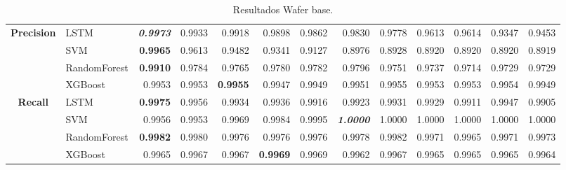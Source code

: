 \begin{table}[H]
\begin{adjustbox}{max width=12cm}
\begin{tabular}{|c|l|r|r|r|r|r|r|r|r|r|r|r|}
			\hline
			\textbf{Precision} &  LSTM & \textit{ \textbf{  0.9973 } } &  0.9933 &  0.9918 &  0.9898 &  0.9862 &  0.9830 &  0.9778 &  0.9613 &  0.9614 &  0.9347 &  0.9453 \\
			&  SVM & \textbf{  0.9965 } &  0.9613 &  0.9482 &  0.9341 &  0.9127 &  0.8976 &  0.8928 &  0.8920 &  0.8920 &  0.8920 &  0.8919 \\
			&  RandomForest & \textbf{  0.9910 } &  0.9784 &  0.9765 &  0.9780 &  0.9782 &  0.9796 &  0.9751 &  0.9737 &  0.9714 &  0.9729 &  0.9729 \\
			&  XGBoost &  0.9953 &  0.9953 & \textbf{  0.9955 } &  0.9947 &  0.9949 &  0.9951 &  0.9955 &  0.9953 &  0.9953 &  0.9954 &  0.9949 \\
			\hline
			\textbf{Recall} &  LSTM & \textbf{  0.9975 } &  0.9956 &  0.9934 &  0.9936 &  0.9916 &  0.9923 &  0.9931 &  0.9929 &  0.9911 &  0.9947 &  0.9905 \\
			&  SVM &  0.9956 &  0.9953 &  0.9969 &  0.9984 &  0.9995 & \textit{ \textbf{  1.0000 } } &  1.0000 &  1.0000 &  1.0000 &  1.0000 &  1.0000 \\
			&  RandomForest & \textbf{  0.9982 } &  0.9980 &  0.9976 &  0.9976 &  0.9976 &  0.9978 &  0.9982 &  0.9971 &  0.9965 &  0.9971 &  0.9973 \\
			&  XGBoost &  0.9965 &  0.9967 &  0.9967 & \textbf{  0.9969 } &  0.9969 &  0.9962 &  0.9967 &  0.9965 &  0.9965 &  0.9965 &  0.9964 \\
			\hline
		\end{tabular}
	\end{adjustbox}
	\caption{Resultados Wafer base.}
	\label{tab:Wafer_base}
\end{table}

